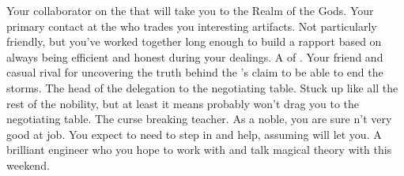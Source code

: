 \documentclass[char]{GL2020}
\begin{document}
\begin{contacts}
	\contact{\cFlowPriest{}} Your collaborator on the \iBeansNB{} that will take you to the Realm of the Gods.
	\contact{\cChupSecond{}} Your primary contact at the \pSc{} who trades you interesting artifacts. Not particularly friendly, but you’ve worked together long enough to build a rapport based on \cChupSecond{\them} always being efficient and honest during your dealings.
	\contact{\cHedonist{}} A \cHedonist{\cleric} of \cFarmGod{}. Your friend and casual rival for uncovering the truth behind the \pTech{}’s claim to be able to end the storms.
	\contact{\cEvil{}} The head of the \pFarm{} delegation to the negotiating table. Stuck up like all the rest of the nobility, but at least it means \cEvil{\they} probably won’t drag you to the negotiating table.
	\contact{\cPrince{}} The curse breaking teacher. As a noble, you are sure \cPrince{\they} \cPrince{\are}n’t very good at \cPrince{\their} job. You expect to need to step in and help, assuming \cPrince{} will let you.
	\contact{\cBunker{}} A brilliant engineer who you hope to work with and talk magical theory with this weekend.
\end{contacts}
\end{document}

